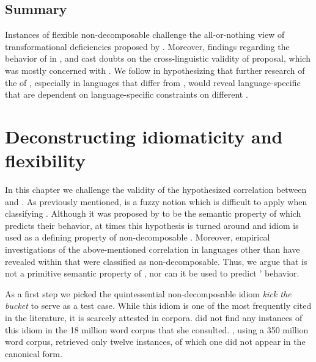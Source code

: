 \documentclass[output=paper]{langsci/langscibook}
\begin{document}
\subsection{Summary}
Instances of flexible non-decomposable  challenge the
all-or-nothing view of transformational deficiencies proposed by \citet{nunberg94}. Mo\-reover, findings regarding the behavior of  in ,  and  cast doubts on the cross-linguistic validity of  proposal, which was mostly concerned with  . We follow \citet{bargmannsailer15} in hypothesizing that further research of the  of ,
especially in languages that differ from , would reveal
language-specific  that are dependent on language-specific
constraints on different .

\section{Deconstructing idiomaticity and flexibility}

In this chapter we challenge the validity of the hypothesized correlation between  and . As previously mentioned,  is a fuzzy notion which is difficult to apply when classifying . Although it was proposed by \citet{nunberg94} to be the semantic property of  which predicts their behavior, at times this hypothesis is turned around and idiom  is used as a defining property of non-decomposable . Moreover, empirical investigations of the above-mentioned correlation in languages other than  have revealed  within  that were classified as non-decomposable. Thus, we argue that  is not a primitive semantic property of , nor can it be used to predict ' behavior.

As a first step we picked the quintessential non-decomposable idiom \textit{kick the bucket} to serve as a test case. While this idiom is one of the most frequently cited  in the literature, it is scarcely attested in corpora. \citet{moon98} did not find any instances of this idiom in the 18 million word corpus that she consulted. \citet{riehemann01}, using a 350 million word corpus, retrieved only twelve instances, of which one did not appear in the canonical form.
\end{document}
